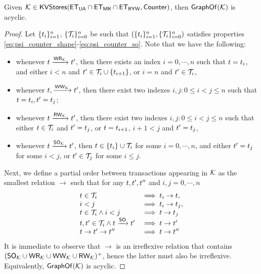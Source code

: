 \begin{corollary}
\label{cor:psi_counter_acyclic}
Given $\mathcal{K} \in \mathsf{KVStores}(\mathsf{ET}_{\mathsf{UA}} \cap \mathsf{ET}_{\mathsf{MR}} \cap \mathsf{ET}_{\mathsf{RYW}}, \mathsf{Counter})$, 
then $\mathsf{GraphOf}(\mathcal{K})$ is acyclic.
\end{corollary}

\begin{proof}
Let $\{t_{i}\}_{i=1}^{n}$, $\{\mathcal{T}_{i}\}_{i=0}^{n}$ 
be such that $(\{t_{i}\}_{i=1}^{n}, \{\mathcal{T}_{i}\}_{i=0}^{n})$ 
satisfies properties \eqref{eq:psi_counter_shape}-\eqref{eq:psi_counter_so}. 
Note that we have the following: 
\begin{itemize}
\item whenever $t \xrightarrow{\mathsf{WR}_{\mathcal{K}}} t'$, then 
there exists an index $i = 0,\cdots, n$ such that $t = t_{i}$, 
and either $i < n$ and $t' \in \mathcal{T}_{i} \cup \{ t_{i+1} \}$, 
or $i = n$ and $t' \in \mathcal{T}_{i}$, 
\item whenever $t, \xrightarrow{\mathsf{WW}_{\mathcal{K}}} t'$, 
then there exist two indexes $i, j: 0 \leq i < j \leq n$ such that 
$t = t_{i}, t' = t_{j}$; 
\item whenever $t \xrightarrow{\mathsf{RW}_{\mathcal{K}}} t'$, then 
there exist two indexes $i, j: 0 \leq i < j \leq n$ such that either 
$t \in \mathcal{T}_{i}$ and $t' = t_{j}$, or $t = t_{i+1}$, 
$i+1 < j$ and $t' = t_{j}$, 
\item whenever $t \xrightarrow{\mathsf{SO}_{\mathcal{K}}} t'$, then 
$t \in \{t_{i}\} \cup \mathcal{T}_{i}$ for some $i=0,\cdots,n$, 
and either $t' = t_{j}$ for some $i < j$,  or $t' \in \mathcal{T}_{j}$ for 
some $i \leq j$.
\end{itemize}
Next, we define a partial order between transactions appearing in $\mathcal{K}$ 
as the smallest relation $\rightarrow$ such that for any $t, t', t''$ and 
$i,j = 0,\cdots, n$
\[
\begin{array}{ll}
t \in \mathcal{T}_{i} &\implies t_{i} \rightarrow t,\\
i < j &\implies t_{i} \rightarrow t_{j},\\
t \in \mathcal{T}_{i} \wedge i < j & \implies t \rightarrow t_{j}\\
t, t' \in \mathcal{T}_{i} \wedge t \xrightarrow{\mathsf{SO}} t' &\implies t \rightarrow t'\\
t \rightarrow t' \rightarrow t'' &\implies t \rightarrow t''
\end{array}
\]
It is immediate to observe that $\rightarrow$ is an irreflexive relation that contains $(\mathsf{SO}_{\mathcal{K}} \cup \mathsf{WR}_{\mathcal{K}} \cup \mathsf{WW}_{\mathcal{K}} \cup \mathsf{RW}_{\mathcal{K}})^+$, 
hence the latter must also be irreflexive. Equivalently, $\mathsf{GraphOf}(\mathcal{K})$ is acyclic.
\end{proof}

